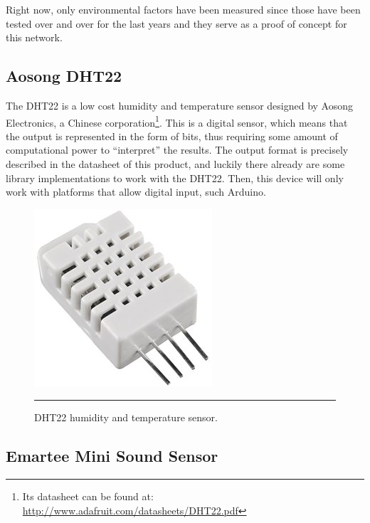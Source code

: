 Right now, only environmental factors have been measured since those have been tested over and over for the last years and they serve as a proof of concept for this network.

\subsection{Aosong DHT22}
\label{sub:dht}

The DHT22 is a low cost humidity and temperature sensor designed by Aosong Electronics, a Chinese corporation\footnote{Its datasheet can be found at: \url{http://www.adafruit.com/datasheets/DHT22.pdf}}. This is a digital sensor, which means that the output is represented in the form of bits, thus requiring some amount of computational power to ``interpret'' the results. The output format is precisely described in the datasheet of this product, and luckily there already are some library implementations to work with the DHT22. Then, this device will only work with platforms that allow digital input, such Arduino.

\begin{figure}[htbp]
    \centering
        \includegraphics[scale=0.8]{./Figures/dht22.jpg}
        \rule{35em}{0.5pt}
    \caption[DHT22 sensor]{DHT22 humidity and temperature sensor.}
    \label{fig:DHT22}
\end{figure}



\subsection{Emartee Mini Sound Sensor}
\label{sub:sound}

